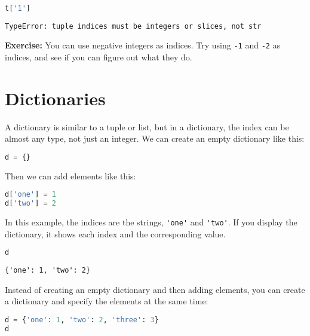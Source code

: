 \begin{lstlisting}[language=Python,style=source]
%%expect TypeError

t['1']
\end{lstlisting}

\begin{lstlisting}[style=output]
TypeError: tuple indices must be integers or slices, not str
\end{lstlisting}

\textbf{Exercise:} You can use negative integers as indices. Try using
\passthrough{\lstinline!-1!} and \passthrough{\lstinline!-2!} as
indices, and see if you can figure out what they do.

\section{Dictionaries}\label{dictionaries-1}

A dictionary is similar to a tuple or list, but in a dictionary, the
index can be almost any type, not just an integer. We can create an
empty dictionary like this:

\begin{lstlisting}[language=Python,style=source]
d = {}
\end{lstlisting}

Then we can add elements like this:

\begin{lstlisting}[language=Python,style=source]
d['one'] = 1
d['two'] = 2
\end{lstlisting}

In this example, the indices are the strings,
\passthrough{\lstinline!'one'!} and \passthrough{\lstinline!'two'!}. If
you display the dictionary, it shows each index and the corresponding
value.

\begin{lstlisting}[language=Python,style=source]
d
\end{lstlisting}

\begin{lstlisting}[style=output]
{'one': 1, 'two': 2}
\end{lstlisting}

Instead of creating an empty dictionary and then adding elements, you
can create a dictionary and specify the elements at the same time:

\begin{lstlisting}[language=Python,style=source]
d = {'one': 1, 'two': 2, 'three': 3}
d
\end{lstlisting}

